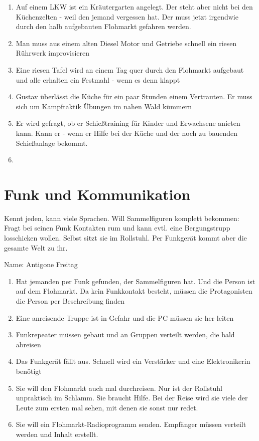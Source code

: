 \documentclass{book}
\begin{document}
\begin{enumerate}
\item Auf einem LKW ist ein Kräutergarten angelegt. Der steht aber nicht bei den Küchenzelten - weil den jemand vergessen hat. Der muss jetzt irgendwie durch den halb aufgebauten Flohmarkt gefahren werden.
\item Man muss aus einem alten Diesel Motor und Getriebe schnell ein riesen Rührwerk improvisieren
\item Eine riesen Tafel wird an einem Tag quer durch den Flohmarkt aufgebaut und alle erhalten ein Festmahl - wenn es denn klappt
\item Gustav überlässt die Küche für ein paar Stunden einem Vertrauten. Er muss sich um Kampftaktik Übungen im nahen Wald kümmern
\item Er wird gefragt, ob er Schießtraining für Kinder und Erwachsene anieten kann. Kann er - wenn er Hilfe bei der Küche und der noch zu bauenden Schießanlage bekommt.
\item
\end{enumerate}

\section{Funk und Kommunikation}
Kennt jeden, kann viele Sprachen. Will Sammelfiguren komplett bekommen: Fragt bei seinen Funk Kontakten rum und kann evtl. eine Bergungstrupp losschicken wollen. Selbst sitzt sie im Rollstuhl. Per Funkgerät kommt aber die gesamte Welt zu ihr.

Name: Antigone Freitag

\begin{enumerate}
\item Hat jemanden per Funk gefunden, der Sammelfiguren hat. Und die Person ist auf dem Flohmarkt. Da kein Funkkontakt besteht, müssen die Protagonisten die Person per Beschreibung finden
\item Eine anreisende Truppe ist in Gefahr und die PC müssen sie her leiten
\item Funkrepeater müssen gebaut und an Gruppen verteilt werden, die bald abreisen
\item Das Funkgerät fällt aus. Schnell wird ein Verstärker und eine Elektronikerin benötigt
\item Sie will den Flohmarkt auch mal durchreisen. Nur ist der Rollstuhl unpraktisch im Schlamm. Sie braucht Hilfe. Bei der Reise wird sie viele der Leute zum ersten mal sehen, mit denen sie sonst nur redet.
\item Sie will ein Flohmarkt-Radioprogramm senden. Empfänger müssen verteilt werden und Inhalt erstellt.
\end{enumerate}
\end{document}
